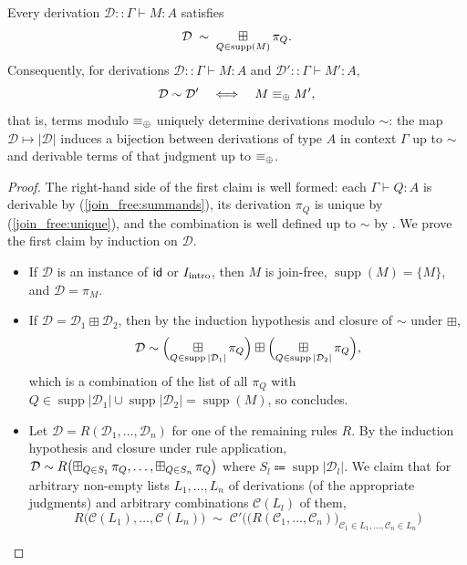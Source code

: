 \begin{theorem}[Coherence]
\label{theorem:coherence}
Every derivation $\mathcal{D} :: \Gamma \vdash M : A$ satisfies
\[
\mathcal{D} \;\sim\; \mathop{\boxplus}\displaylimits_{Q \in \operatorname{supp}(M)} \pi_{Q}.
\]
Consequently, for derivations $\mathcal{D} :: \Gamma \vdash M : A$ and $\mathcal{D}' :: \Gamma \vdash M' : A$,
\[
\mathcal{D} \sim \mathcal{D}' \quad\Longleftrightarrow\quad M \equiv_{\mathbin{\oplus}} M',
\]
that is, terms modulo $\equiv_{\mathbin{\oplus}}$ uniquely determine derivations modulo $\sim$: the map $\mathcal{D} \mapsto |\mathcal{D}|$ induces a bijection between derivations of type $A$ in context $\Gamma$ up to $\sim$ and derivable terms of that judgment up to $\equiv_{\mathbin{\oplus}}$.
\end{theorem}
\begin{proof}
The right-hand side of the first claim is well formed: each $\Gamma \vdash Q : A$ is derivable by (\ref{join_free:summands}), its derivation $\pi_Q$ is unique by (\ref{join_free:unique}), and the combination is well defined up to $\sim$ by .
We prove the first claim by induction on $\mathcal{D}$.
\begin{itemize}
  \item If $\mathcal{D}$ is an instance of $\textsf{id}$ or $I_{\text{intro}}$, then $M$ is join-free, $\operatorname{supp}(M) = \{M\}$, and $\mathcal{D} = \pi_{M}$.
  \item If $\mathcal{D} = \mathcal{D}_1 \boxplus \mathcal{D}_2$, then by the induction hypothesis and closure of $\sim$ under $\boxplus$,
  \[
  \mathcal{D} \sim \Bigl(\mathop{\boxplus}\displaylimits_{Q \in \operatorname{supp}|\mathcal{D}_1|} \pi_Q\Bigr) \boxplus \Bigl(\mathop{\boxplus}\displaylimits_{Q \in \operatorname{supp}|\mathcal{D}_2|} \pi_Q\Bigr),
  \]
  which is a combination of the list of all $\pi_Q$ with $Q \in \operatorname{supp}|\mathcal{D}_1| \cup \operatorname{supp}|\mathcal{D}_2| = \operatorname{supp}(M)$, so  concludes.
  \item Let $\mathcal{D} = R(\mathcal{D}_1, \ldots, \mathcal{D}_n)$ for one of the remaining rules $R$.
  By the induction hypothesis and closure under rule application,
  $\mathcal{D} \sim R\bigl(\mathop{\boxplus}\displaylimits_{Q \in S_1} \pi_Q, \ldots, \mathop{\boxplus}\displaylimits_{Q \in S_n} \pi_Q\bigr)$ where $S_l \Coloneqq \operatorname{supp}|\mathcal{D}_l|$.
  We claim that for arbitrary non-empty lists $L_1, \ldots, L_n$ of derivations (of the appropriate judgments) and arbitrary combinations $\mathcal{C}(L_l)$ of them,
  \[
  R\bigl(\mathcal{C}(L_1), \ldots, \mathcal{C}(L_n)\bigr) \;\sim\; \mathcal{C}'\bigl( \bigl( R(\mathcal{C}_1, \ldots, \mathcal{C}_n) \bigr)_{\mathcal{C}_1 \in L_1, \ldots, \mathcal{C}_n \in L_n} \bigr)
\]
\end{itemize}
\end{proof}
